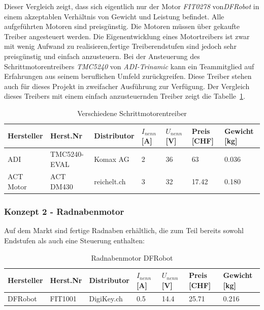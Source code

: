 \documentclass[main.  tex]{subfiles} %
\begin{document}
Dieser Vergleich zeigt, dass sich eigentlich nur der Motor \textit{FIT0278}
von\textit{DFRobot} in einem akzeptablen Verhältnis von Gewicht und Leistung
befindet. Alle aufgeführten Motoren sind preisgünstig. Die Motoren müssen über
gekaufte Treiber angesteuert werden. Die Eigenentwicklung eines Motortreibers
ist zwar mit wenig Aufwand zu realisieren,fertige Treiberendstufen sind jedoch
sehr preisgünstig und einfach anzusteuern. Bei der Ansteuerung des
Schrittmotorentreibers \textit{TMC5240} von \textit{ADI-Trinamic} kann ein
Teammitglied auf Erfahrungen aus seinem beruflichen Umfeld zurückgreifen. Diese
Treiber stehen auch für dieses Projekt in zweifacher Ausführung zur Verfügung.
Der Vergleich dieses Treibers mit einem einfach anzusteuernden Treiber zeigt
die Tabelle~\ref{tab:Schrittmotorentreiber_different}.

\begin{table}[h]
    \centering
    \begin{tabular}{|p{2cm}|p{3cm}|p{2cm}|p{1cm}|p{1cm}|p{1cm}|p{1.5cm}|}
        \hline
        Hersteller & Herst.Nr     & Distributor & $I_{nenn} $ [A] & $U_{nenn}$ [V] & Preis [CHF] & Gewicht [kg] \\ \hline
        ADI        & TMC5240-EVAL & Komax AG    & 2               & 36             & 63          & 0.036        \\ \hline
        ACT Motor  & ACT DM430    & reichelt.ch & 3               & 32             & 17.42       & 0.180        \\ \hline
    \end{tabular}
    \caption{Verschiedene Schrittmotorentreiber}
    \label{tab:Schrittmotorentreiber_different}
\end{table}

\subsubsection*{Konzept 2 - Radnabenmotor} %

Auf dem Markt sind fertige Radnaben erhältlich, die zum Teil bereits sowohl
Endstufen als auch eine Steuerung enthalten:

\begin{table}[h]
    \centering
    \begin{tabular}{|p{2cm}|p{3cm}|p{2cm}|p{1cm}|p{1cm}|p{1cm}|p{1.5cm}|}
        \hline
        Hersteller & Herst.Nr & Distributor & $I_{nenn} $ [A] & $U_{nenn}$ [V] & Preis [CHF] & Gewicht [kg] \\ \hline
        DFRobot    & FIT1001  & DigiKey.ch  & 0.5             & 14.4           & 25.71       & 0.216        \\ \hline
    \end{tabular}
    \caption{Radnabenmotor DFRobot}
\end{table}
\end{document}
